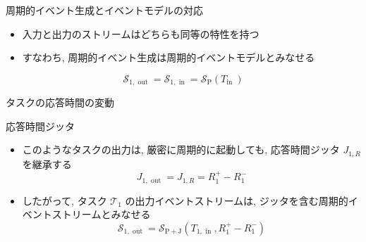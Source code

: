 \begin{frame}{周期的イベント生成とイベントモデルの対応}
    \begin{itemize}
        \item 入力と出力のストリームはどちらも同等の特性を持つ
        \item すなわち, 周期的イベント生成は周期的イベントモデルとみなせる
    \end{itemize}
    \begin{equation*}
        \mathcal{S}_{1, \text { out }}=\mathcal{S}_{1, \text { in }}=\mathcal{S}_{\mathrm{P}}\left(T_{\text {in }}\right)
    \end{equation*}
\end{frame}

\begin{frame}{タスクの応答時間の変動}
\end{frame}

\begin{frame}{応答時間ジッタ}
    \begin{itemize}
        \item このようなタスクの出力は, 厳密に周期的に起動しても, 応答時間ジッタ $J_{1, R}$ を継承する
              \begin{equation*}
                  J_{1, \text { out }}=J_{1, R}=R_{1}^{+}-R_{1}^{-}
              \end{equation*}
        \item したがって, タスク $\mathcal{T}_{1}$ の出力イベントストリームは, ジッタを含む周期的イベントストリームとみなせる
              \begin{equation*}
                  \mathcal{S}_{1, \text { out }}=\mathcal{S}_{\mathrm{P}+\mathrm{J}}\left(T_{1, \text { in }}, R_{1}^{+}-R_{1}^{-}\right)
              \end{equation*}
    \end{itemize}
\end{frame}

